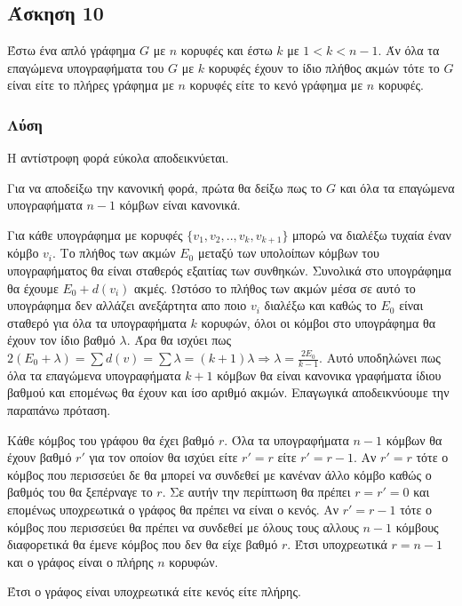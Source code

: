 \newpage\subsection*{Άσκηση 10}

Έστω ένα απλό γράφημα $G$ με $n$ κορυφές και έστω $k$ με $1 < k < n-1$. Άν όλα 
τα επαγώμενα υπογραφήματα του $G$ με $k$ κορυφές έχουν το ίδιο πλήθος ακμών τότε το $G$ 
είναι είτε το πλήρες γράφημα με $n$ κορυφές είτε το κενό γράφημα με $n$ κορυφές.

\subsubsection*{Λύση}

Η αντίστροφη φορά εύκολα αποδεικνύεται.

Για να αποδείξω την κανονική φορά, πρώτα θα δείξω πως το $G$ και όλα τα επαγώμενα υπογραφήματα $n-1$ κόμβων είναι κανονικά.

Για κάθε υπογράφημα με κορυφές $\{v_1,v_2,..,v_k,v_{k+1}\}$ μπορώ να διαλέξω τυχαία έναν κόμβο $v_i$. Το πλήθος των ακμών $E_0$ μεταξύ των υπολοίπων κόμβων του υπογραφήματος
θα είναι σταθερός εξαιτίας των συνθηκών. Συνολικά στο υπογράφημα θα έχουμε $E_0 + d(v_i)$ ακμές. Ωστόσο το πλήθος των ακμών μέσα σε αυτό το υπογράφημα δεν αλλάζει ανεξάρτητα απο ποιο
$v_i$ διαλέξω και καθώς το $E_0$ είναι σταθερό για όλα τα υπογραφήματα $k$ κορυφών, όλοι οι κόμβοι στο υπογράφημα θα έχουν τον ίδιο βαθμό $\lambda$. Άρα θα ισχύει πως 
$2(E_0 + \lambda) = \sum d(v) = \sum \lambda = (k+1)\lambda \Rightarrow \lambda = \frac{2E_0}{k-1}$. Αυτό υποδηλώνει πως όλα τα επαγώμενα υπογραφήματα $k+1$ κόμβων θα είναι κανονικα γραφήματα ίδιου
βαθμού και επομένως θα έχουν και ίσο αριθμό ακμών. Επαγωγικά αποδεικνύουμε την παραπάνω πρόταση. 

Κάθε κόμβος του γράφου θα έχει βαθμό $r$.
Όλα τα υπογραφήματα $n-1$ κόμβων θα έχουν βαθμό $r'$ για τον οποίον θα ισχύει είτε $r' = r$ είτε $r' = r-1$.
Αν $r' = r$ τότε ο κόμβος που περισσεύει δε θα μπορεί να συνδεθεί με κανέναν άλλο κόμβο καθώς ο βαθμός του θα ξεπέρναγε το $r$. 
Σε αυτήν την περίπτωση θα πρέπει $r = r' = 0$ και επομένως υποχρεωτικά ο γράφος θα πρέπει να είναι ο κενός.
Αν $r' = r-1$ τότε ο κόμβος που περισσεύει θα πρέπει να συνδεθεί με όλους τους αλλους $n-1$ κόμβους διαφορετικά θα έμενε κόμβος που δεν
θα είχε βαθμό $r$. Έτσι υποχρεωτικά $r=n-1$ και ο γράφος είναι ο πλήρης $n$ κορυφών.

Έτσι ο γράφος είναι υποχρεωτικά είτε κενός είτε πλήρης. 
